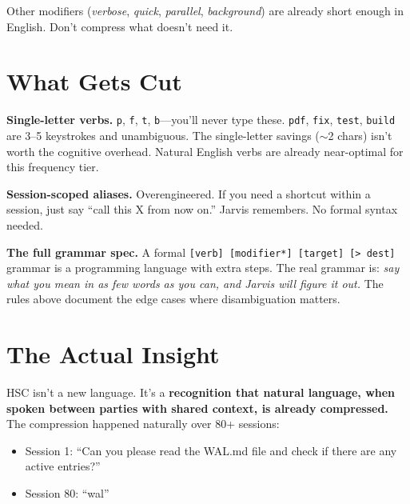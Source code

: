 \documentclass[9pt, letterpaper]{article}
\newcommand{\code}[1]{\texttt{#1}}
\begin{document}
\vspace{0.2em}
Other modifiers (\textit{verbose}, \textit{quick}, \textit{parallel}, \textit{background}) are already short enough in English. Don't compress what doesn't need it.


\section{What Gets Cut}

\textbf{Single-letter verbs.} \code{p}, \code{f}, \code{t}, \code{b}---you'll never type these. \code{pdf}, \code{fix}, \code{test}, \code{build} are 3--5 keystrokes and unambiguous. The single-letter savings ($\sim$2 chars) isn't worth the cognitive overhead. Natural English verbs are already near-optimal for this frequency tier.

\textbf{Session-scoped aliases.} Overengineered. If you need a shortcut within a session, just say ``call this X from now on.'' Jarvis remembers. No formal syntax needed.

\textbf{The full grammar spec.} A formal \code{[verb] [modifier*] [target] [> dest]} grammar is a programming language with extra steps. The real grammar is: \textit{say what you mean in as few words as you can, and Jarvis will figure it out.} The rules above document the edge cases where disambiguation matters.


\section{The Actual Insight}

HSC isn't a new language. It's a \textbf{recognition that natural language, when spoken between parties with shared context, is already compressed.} The compression happened naturally over 80+ sessions:

\begin{itemize}
\item Session 1: ``Can you please read the WAL.md file and check if there are any active entries?''
\item Session 80: ``wal''
\end{itemize}
\end{document}

